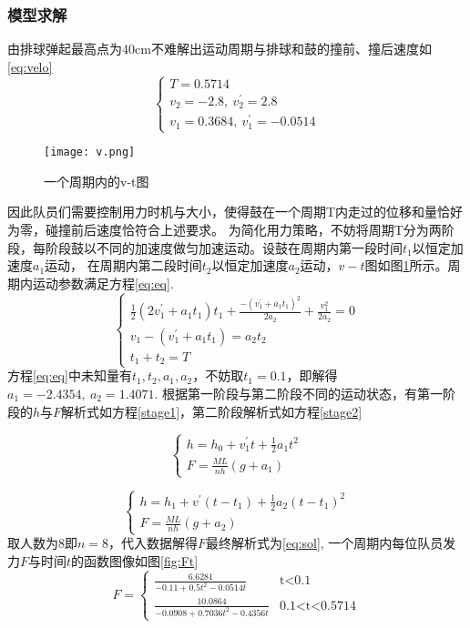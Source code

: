 \documentclass[withoutpreface,bwprint]{cumcmthesis} %
\begin{document}
\subsubsection{模型求解}
由排球弹起最高点为40cm不难解出运动周期与排球和鼓的撞前、撞后速度如\ref{eq:velo}
\begin{equation}
\left\{
\begin{array}{lr}
T = 0.5714 \\
v_2 = -2.8,\ v_2^{'} = 2.8 \\
v_1 = 0.3684,\ v_1^{'} = -0.0514
\end{array}
\right.
\label{eq:velo}
\end{equation}
\begin{figure}
	\centering
	\texttt{[image: v.png]}
	\caption{一个周期内的v-t图}
	\label{fig:vt} %
\end{figure}
因此队员们需要控制用力时机与大小，使得鼓在一个周期T内走过的位移和量恰好为零，碰撞前后速度恰符合上述要求。
为简化用力策略，不妨将周期T分为两阶段，每阶段鼓以不同的加速度做匀加速运动。设鼓在周期内第一段时间$t_1$以恒定加速度$a_1$运动，
在周期内第二段时间$t_2$以恒定加速度$a_2$运动，$v-t$图如图\ref{fig:vt}所示。周期内运动参数满足方程\ref{eq:eq}.
\begin{equation}
\left\{
\begin{array}{lr}
\frac{1}{2}(2v_1^{'}+a_1t_1)t_1 + \frac{-(v_1^{'}+a_1t_1)^2}{2a_2}+\frac{v_1^2}{2a_2} = 0 \\
v_1-(v_1^{'}+a_1t_1) = a_2t_2 \\
t_1 + t_2 = T
\end{array}
\label{eq:eq}
\right.
\end{equation}
方程\ref{eq:eq}中未知量有$t_1, t_2, a_1, a_2$，不妨取$t_1=0.1$，即解得$a_1 = -2.4354,\ a_2 = 1.4071$.
根据第一阶段与第二阶段不同的运动状态，有第一阶段的$h$与$F$解析式如方程\ref{stage1}，第二阶段解析式如方程\ref{stage2}

\begin{equation}
\left\{
\begin{array}{lr}
h=h_0+v_1^{'}t+\frac{1}{2}a_1t^2\\
F=\frac{ML}{nh}(g+a_1)
\end{array}
\right.
\label{stage1}
\end{equation}

\begin{equation}
\left\{
\begin{array}{lr}
h=h_1+v^{'}(t-t_1)+\frac{1}{2}a_2(t-t_1)^2\\
F=\frac{ML}{nh}(g+a_2)
\end{array}
\right.
\label{stage2}
\end{equation}
取人数为8即$n=8$，代入数据解得$F$最终解析式为\ref{eq:sol}, 一个周期内每位队员发力$F$与时间$t$的函数图像如图\ref{fig:Ft}
\begin{equation}
F=
\begin{cases}
\frac{6.6281}{-0.11+0.5t^2-0.0514t}& \text{t<0.1}\\
\frac{10.0864}{-0.0908+0.7036t^2-0.4356t}& \text{0.1<t<0.5714}
\end{cases}
\label{eq:sol}
\end{equation}
\end{document}
